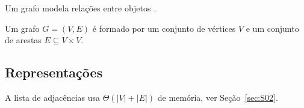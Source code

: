 Um grafo modela relações entre objetos \cite{cormen2009}.
\begin{definicao}[(Grafo)]
Um grafo $G = (V, E)$ é formado por um conjunto de vértices $V$ e um conjunto de arestas $E \subseteq V \times V$.
\end{definicao}
\subsection{Representações}
A lista de adjacências usa $\Theta(|V| + |E|)$ de memória, ver Seção~\ref{sec:S02}.
